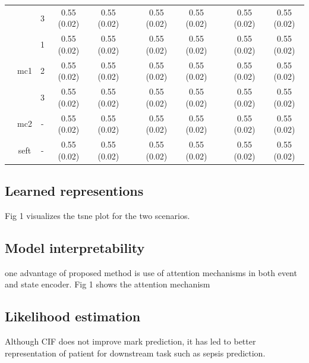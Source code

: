 \documentclass[journal,twoside,web]{ieeecolor}
\begin{document}
\begin{table}[htbp]
\begin{tabular}{ccccccccccc}
            &       & 3     & 0.55 (0.02) & 0.55 (0.02) &       & 0.55 (0.02) & 0.55 (0.02) &       & 0.55 (0.02) & 0.55 (0.02) \\
  \cmidrule{2-11}          & \multirow{3}[2]{*}{mc1} & 1     & 0.55 (0.02) & 0.55 (0.02) &       & 0.55 (0.02) & 0.55 (0.02) &       & 0.55 (0.02) & 0.55 (0.02) \\
            &       & 2     & 0.55 (0.02) & 0.55 (0.02) &       & 0.55 (0.02) & 0.55 (0.02) &       & 0.55 (0.02) & 0.55 (0.02) \\
            &       & 3     & 0.55 (0.02) & 0.55 (0.02) &       & 0.55 (0.02) & 0.55 (0.02) &       & 0.55 (0.02) & 0.55 (0.02) \\
  \cmidrule{2-11}          & mc2   & -     & 0.55 (0.02) & 0.55 (0.02) &       & 0.55 (0.02) & 0.55 (0.02) &       & 0.55 (0.02) & 0.55 (0.02) \\
            & seft  & -     & 0.55 (0.02) & 0.55 (0.02) &       & 0.55 (0.02) & 0.55 (0.02) &       & 0.55 (0.02) & 0.55 (0.02) \\
      \bottomrule
      \end{tabular}%
    \label{tab:addlabel}%
  \end{table}%
  
  
  
  








\subsection{Learned representions}
Fig 1 visualizes the tsne plot for the two scenarios.


\subsection{Model interpretability}

one advantage of proposed method is use of attention mechanisms in both event and state encoder.
Fig 1 shows the attention mechanism



\subsection{Likelihood estimation}

Although CIF does not improve mark prediction, it has led to better representation of patient for downstream task such as sepsis prediction.
\end{document}
